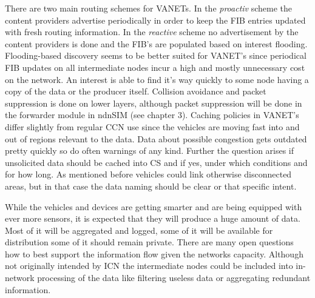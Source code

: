 There are two main routing schemes for VANETs. In the \emph{proactiv} scheme the content providers advertise periodically in order to keep the FIB entries updated with fresh routing information. In the \emph{reactive} scheme no advertisement by the content providers is done and the FIB's are populated based on interest flooding. Flooding-based discovery seems to be better suited for VANET's since periodical FIB updates on all intermediate nodes incur a high and mostly unnecessary cost on the network. An interest is able to find it's way quickly to some node having a copy of the data or the producer itself. Collision avoidance and packet suppression is done on lower layers, although packet suppression will be done in the forwarder module in ndnSIM (see chapter 3).
Caching policies in VANET's differ slightly from regular CCN use since the vehicles are moving fast into and out of regions relevant to the data. Data about possible congestion gets outdated pretty quickly so do often warnings of any kind. Further the question arises if unsolicited data should be cached into CS and if yes, under which conditions and for how long. As mentioned before vehicles could link otherwise disconnected areas, but in that case the data naming should be clear or that specific intent.

\vspace{5mm} %

While the vehicles and devices are getting smarter and are being equipped with ever more sensors, it is expected that they will produce a huge amount of data. Most of it will be aggregated and logged, some of it will be available for distribution some of it should remain private. There are many open questions how to best support the information flow given the networks capacity. Although not originally intended by ICN the intermediate nodes could be included into in-network processing of the data like filtering useless data or aggregating redundant information.








